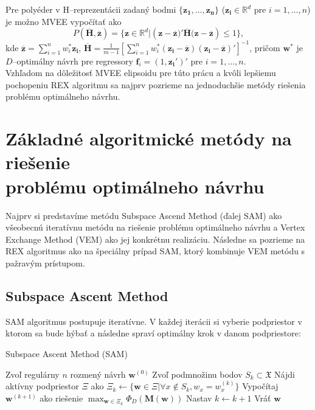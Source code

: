 Pre polyéder v H--reprezentácii zadaný bodmi $\{ \mathbf{z_1, \dots, z_n} \}$ ($\mathbf{z_i} \in \mathbb{R}^d$ pre $i=1,\dots, n$) je možno MVEE vypočítať ako $$P(\mathbf{\overline H, \overline z})= \{ \mathbf{z} \in \mathbb{R}^d | (\mathbf{z-\overline z)'\overline H(z-\overline z}) \le 1 \}, $$ kde $\mathbf{\overline z}=\sum_{i=1}^n w_i^*\mathbf{z_i}$, $\mathbf{\overline H}=\frac{1}{m-1} \left[ \sum_{i=1}^n w_i^*\mathbf{(z_i-\overline z)(z_i-\overline z)'} \right]^{-1} $, pričom $\mathbf{w^*}$ je $D$--optimálny návrh pre regressory $\mathbf{f}_i=(1,\mathbf{z_i}')'$ pre $i=1,\dots, n$.\\

Vzhľadom na dôležitosť MVEE elipsoidu pre túto prácu a kvôli lepšiemu pochopeniu REX algoritmu sa najprv pozrieme na jednoduchšie metódy riešenia problému optimálneho návrhu.

\section[Základné algoritmické metódy]{Základné algoritmické metódy na riešenie\\ problému optimálneho návrhu}

Najprv si predstavíme metódu Subspace Ascend Method (ďalej SAM) ako všeobecnú iteratívnu metódu na riešenie problému optimálneho návrhu a Vertex Exchange Method (VEM) ako jej konkrétnu realizáciu. Následne sa pozrieme na REX algoritmus ako na špeciálny prípad SAM, ktorý kombinuje VEM metódu s pažravým prístupom.

\subsection{Subspace Ascent Method}

SAM algoritmus postupuje iteratívne. V každej iterácii si vyberie podpriestor v ktorom sa bude hýbať a následne spraví optimálny krok v danom podpriestore:

\begin{algorithm}[H]
	\caption{Subspace Ascent Method (SAM) \cite{rex_harman}}
	\label{sam}
	\begin{algorithmic}[1]
		\State Zvoľ regulárny $n$ rozmený návrh $\mathbf w^{(0)}$
			\State Zvoľ podmnožinu bodov $S_k \subset \mathfrak X$
			\State Nájdi aktívny podpriestor $\Xi$ ako $\Xi_k \leftarrow \{ \mathbf w \in \Xi | \forall x \not \in S_k, w_x = w_x^{(k)} \}$
			\State Vypočítaj $\mathbf w^{(k+1)}$ ako riešenie $\max_{\mathbf w \in \Xi_k} \Phi_D(\mathbf{M(w)})$
			\State Nastav $k \leftarrow k+1$
		\EndWhile
		\State Vráť $\mathbf w$
	\end{algorithmic}
\end{algorithm}

